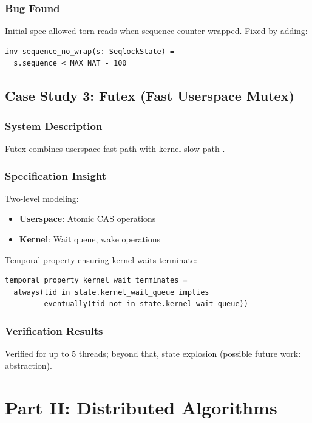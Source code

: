 \documentclass[conference]{IEEEtran}
\begin{document}
\subsubsection{Bug Found}

Initial spec allowed torn reads when sequence counter wrapped. Fixed by adding:

\begin{lstlisting}
inv sequence_no_wrap(s: SeqlockState) =
  s.sequence < MAX_NAT - 100
\end{lstlisting}

\subsection{Case Study 3: Futex (Fast Userspace Mutex)}

\subsubsection{System Description}

Futex combines userspace fast path with kernel slow path \cite{futex}.

\subsubsection{Specification Insight}

Two-level modeling:
\begin{itemize}
\item \textbf{Userspace}: Atomic CAS operations
\item \textbf{Kernel}: Wait queue, wake operations
\end{itemize}

Temporal property ensuring kernel waits terminate:

\begin{lstlisting}
temporal property kernel_wait_terminates =
  always(tid in state.kernel_wait_queue implies
         eventually(tid not_in state.kernel_wait_queue))
\end{lstlisting}

\subsubsection{Verification Results}

Verified for up to 5 threads; beyond that, state explosion (possible future work: abstraction).

\section{Part II: Distributed Algorithms}
\end{document}
